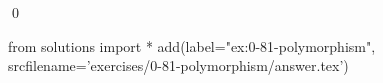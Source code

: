 
\begin{ex}
  \label{ex:0-81-polymorphism}
  
  \qed
\end{ex}
\begin{python0}
from solutions import *
add(label="ex:0-81-polymorphism",
    srcfilename='exercises/0-81-polymorphism/answer.tex')
\end{python0}
